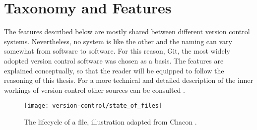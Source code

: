 

\section{Taxonomy and Features}
The features described below are mostly shared between different version control systems. Nevertheless, no system is like the other and the naming can vary somewhat from software to software. For this reason, Git, the most widely adopted version control software \cite{_stack_2015} was chosen as a basis. The features are explained conceptually, so that the reader will be equipped to follow the reasoning of this thesis. For a more technical and detailed description of the inner workings of version control other sources can be consulted \cite{baudis_current_2009,chacon_pro_2009,pilato_version_2008}.

\begin{figure}
 \centering
 \texttt{[image: version-control/state\_of\_files]}
 \caption{The lifecycle of a file, illustration adapted from Chacon \cite[p.~45]{chacon_pro_2009}.}
 \label{fig:file-state}
\end{figure}

